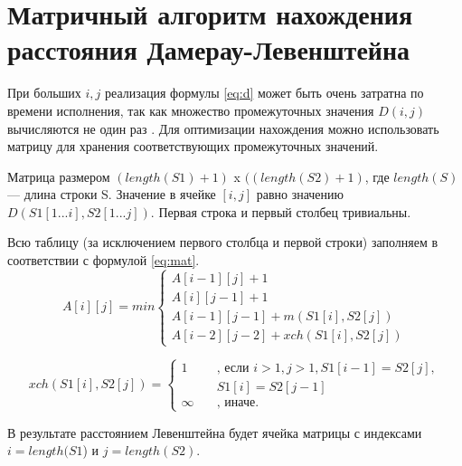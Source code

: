 \section{Матричный алгоритм нахождения расстояния Дамерау-Левенштейна}

При больших $i, j$ реализация формулы \ref{eq:d} может быть очень затратна по времени исполнения, так как множество промежуточных значения $ D(i, j)$ вычисляются не один раз . Для оптимизации нахождения можно использовать матрицу для хранения соответствующих промежуточных значений.

Матрица размером $(length(S1)+ 1)$ x $((length(S2) + 1)$, где $length(S)$ — длина строки S. Значение в ячейке $[i, j]$ равно значению $D(S1[1...i], S2[1...j])$. Первая строка и первый столбец тривиальны. 

Всю таблицу (за исключением первого столбца и первой строки) заполняем в соответствии с формулой \ref{eq:mat}.
\begin{equation}
	\label{eq:mat}
	A[i][j] = min \begin{cases}
		A[i-1][j] + 1\\
		 A[i][j-1] + 1\\
		 A[i-1][j-1] + m(S1[i], S2[j])\\
		 A[i - 2][j - 2] + xch(S1[i], S2[j])
	 \end{cases}
 \end{equation}

\begin{equation}
	xch(S1[i], S2[j]) = \begin{cases}
		1 &\text{, если } i > 1, j > 1, S1[i - 1] = S2[j],\\
			\qquad&\text{} S1[i] = S2[j - 1]\\
		\infty  &\text{, иначе.}
	\end{cases}
\end{equation}
 
В результате расстоянием Левенштейна будет ячейка матрицы с индексами $i = length(S1$) и $j = length(S2)$.
